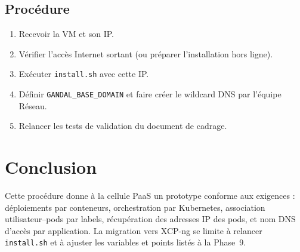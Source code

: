 \documentclass[12pt,a4paper]{article}
\begin{document}
\subsection{Procédure}
\begin{enumerate}
    \item Recevoir la VM et son IP.
    \item Vérifier l'accès Internet sortant (ou préparer l'installation hors ligne).
    \item Exécuter \texttt{install.sh} avec cette IP.
    \item Définir \nolinkurl{GANDAL_BASE_DOMAIN} et faire créer le wildcard DNS par l'équipe Réseau.
    \item Relancer les tests de validation du document de cadrage.
\end{enumerate}

\section{Conclusion}

Cette procédure donne à la cellule PaaS un prototype conforme aux exigences : déploiements par conteneurs, orchestration par Kubernetes, association utilisateur--pods par labels, récupération des adresses IP des pods, et nom DNS d'accès par application. La migration vers XCP-ng se limite à relancer \texttt{install.sh} et à ajuster les variables et points listés à la Phase~9.
\end{document}
